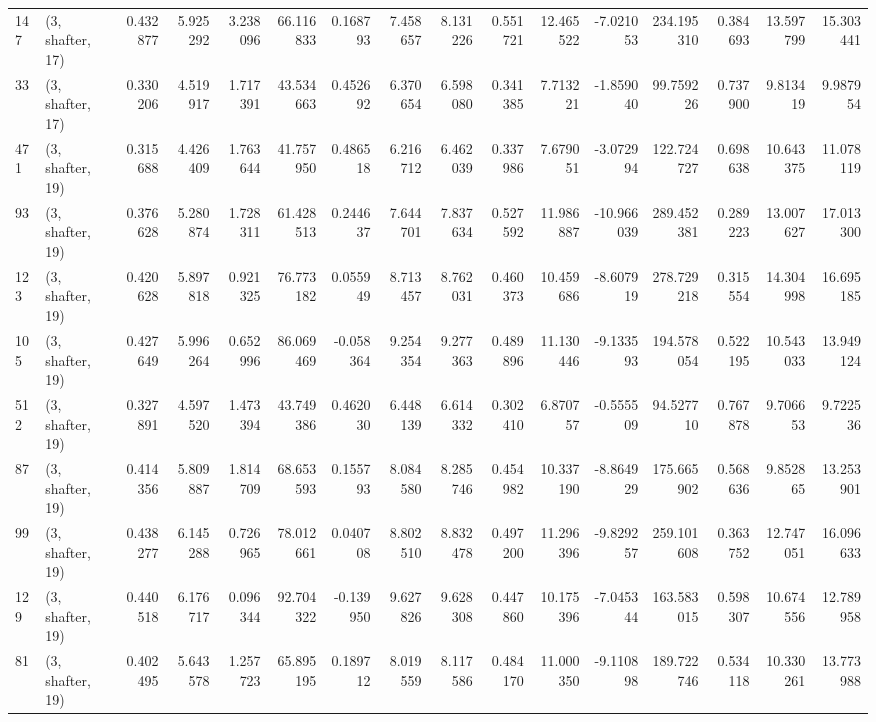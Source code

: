\begin{tabular}{llrrrrrrrrrrrrrr}
147 &  (3, shafter, 17) &   0.432877 &   5.925292 &   3.238096 &    66.116833 &   0.168793 &   7.458657 &   8.131226 &  0.551721 &  12.465522 &  -7.021053 &   234.195310 &  0.384693 &  13.597799 &  15.303441 \\
33  &  (3, shafter, 17) &   0.330206 &   4.519917 &   1.717391 &    43.534663 &   0.452692 &   6.370654 &   6.598080 &  0.341385 &   7.713221 &  -1.859040 &    99.759226 &  0.737900 &   9.813419 &   9.987954 \\
471 &  (3, shafter, 19) &   0.315688 &   4.426409 &   1.763644 &    41.757950 &   0.486518 &   6.216712 &   6.462039 &  0.337986 &   7.679051 &  -3.072994 &   122.724727 &  0.698638 &  10.643375 &  11.078119 \\
93  &  (3, shafter, 19) &   0.376628 &   5.280874 &   1.728311 &    61.428513 &   0.244637 &   7.644701 &   7.837634 &  0.527592 &  11.986887 & -10.966039 &   289.452381 &  0.289223 &  13.007627 &  17.013300 \\
123 &  (3, shafter, 19) &   0.420628 &   5.897818 &   0.921325 &    76.773182 &   0.055949 &   8.713457 &   8.762031 &  0.460373 &  10.459686 &  -8.607919 &   278.729218 &  0.315554 &  14.304998 &  16.695185 \\
105 &  (3, shafter, 19) &   0.427649 &   5.996264 &   0.652996 &    86.069469 &  -0.058364 &   9.254354 &   9.277363 &  0.489896 &  11.130446 &  -9.133593 &   194.578054 &  0.522195 &  10.543033 &  13.949124 \\
512 &  (3, shafter, 19) &   0.327891 &   4.597520 &   1.473394 &    43.749386 &   0.462030 &   6.448139 &   6.614332 &  0.302410 &   6.870757 &  -0.555509 &    94.527710 &  0.767878 &   9.706653 &   9.722536 \\
87  &  (3, shafter, 19) &   0.414356 &   5.809887 &   1.814709 &    68.653593 &   0.155793 &   8.084580 &   8.285746 &  0.454982 &  10.337190 &  -8.864929 &   175.665902 &  0.568636 &   9.852865 &  13.253901 \\
99  &  (3, shafter, 19) &   0.438277 &   6.145288 &   0.726965 &    78.012661 &   0.040708 &   8.802510 &   8.832478 &  0.497200 &  11.296396 &  -9.829257 &   259.101608 &  0.363752 &  12.747051 &  16.096633 \\
129 &  (3, shafter, 19) &   0.440518 &   6.176717 &   0.096344 &    92.704322 &  -0.139950 &   9.627826 &   9.628308 &  0.447860 &  10.175396 &  -7.045344 &   163.583015 &  0.598307 &  10.674556 &  12.789958 \\
81  &  (3, shafter, 19) &   0.402495 &   5.643578 &   1.257723 &    65.895195 &   0.189712 &   8.019559 &   8.117586 &  0.484170 &  11.000350 &  -9.110898 &   189.722746 &  0.534118 &  10.330261 &  13.773988 \\

\end{tabular}
